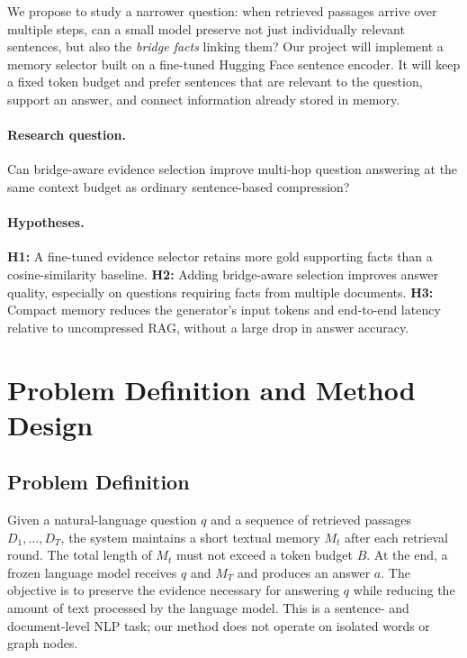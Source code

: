 \documentclass[11pt]{article}
\begin{document}
We propose to study a narrower question: when retrieved passages arrive over multiple steps, can a small model preserve not just individually relevant sentences, but also the \emph{bridge facts} linking them? Our project will implement a memory selector built on a fine-tuned Hugging Face sentence encoder. It will keep a fixed token budget and prefer sentences that are relevant to the question, support an answer, and connect information already stored in memory.

\paragraph{Research question.} Can bridge-aware evidence selection improve multi-hop question answering at the same context budget as ordinary sentence-based compression?

\paragraph{Hypotheses.} \textbf{H1:} A fine-tuned evidence selector retains more gold supporting facts than a cosine-similarity baseline. \textbf{H2:} Adding bridge-aware selection improves answer quality, especially on questions requiring facts from multiple documents. \textbf{H3:} Compact memory reduces the generator's input tokens and end-to-end latency relative to uncompressed RAG, without a large drop in answer accuracy.

\section{Problem Definition and Method Design}

\subsection{Problem Definition}

Given a natural-language question $q$ and a sequence of retrieved passages $D_1,\ldots,D_T$, the system maintains a short textual memory $M_t$ after each retrieval round. The total length of $M_t$ must not exceed a token budget $B$. At the end, a frozen language model receives $q$ and $M_T$ and produces an answer $a$. The objective is to preserve the evidence necessary for answering $q$ while reducing the amount of text processed by the language model. This is a sentence- and document-level NLP task; our method does not operate on isolated words or graph nodes.
\end{document}
